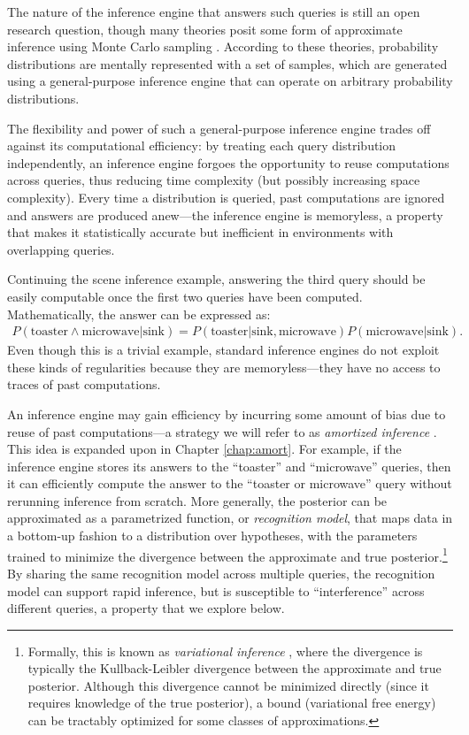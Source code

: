 The nature of the inference engine that answers such queries is still an open research question, though many theories posit some form of approximate inference using Monte Carlo sampling \citep[e.g.,][]{thaker17,dasgupta17,vul2014one,gershman12,denison13,sanborn2016bayesian,ullman2012theory}. According to these theories, probability distributions are mentally represented with a set of samples, which are generated using a general-purpose inference engine that can operate on arbitrary probability distributions.

The flexibility and power of such a general-purpose inference engine trades off against its computational efficiency: by treating each query distribution independently, an inference engine forgoes the opportunity to reuse computations across queries, thus reducing time complexity (but possibly increasing space complexity). Every time a distribution is queried, past computations are ignored and answers are produced anew---the inference engine is memoryless, a property that makes it statistically accurate but inefficient in environments with overlapping queries.

Continuing the scene inference example, answering the third query should be easily computable once the first two queries have been computed. Mathematically, the answer can be expressed as:
\begin{align}
P(\text{toaster} \wedge \text{microwave}|\text{sink}) = P(\text{toaster}|\text{sink},\text{microwave}) P(\text{microwave}|\text{sink}).
\end{align}
Even though this is a trivial example, standard inference engines do not exploit these kinds of regularities because they are memoryless---they have no access to traces of past computations.

An inference engine may gain efficiency by incurring some amount of bias due to reuse of past computations---a strategy we will refer to as \emph{amortized inference} \citep{stuhlmuller2013learning, gershman2014amortized}. This idea is expanded upon in Chapter \ref{chap:amort}. For example, if the inference engine stores its answers to the ``toaster'' and ``microwave'' queries, then it can efficiently compute the answer to the ``toaster or microwave'' query without rerunning inference from scratch. More generally, the posterior can be approximated as a parametrized function, or \emph{recognition model}, that maps data in a bottom-up fashion to a distribution over hypotheses, with the parameters trained to minimize the divergence between the approximate and true posterior.\footnote{Formally, this is known as \emph{variational inference} \citep{jordan1999introduction}, where the divergence is typically the Kullback-Leibler divergence between the approximate and true posterior. Although this divergence cannot be minimized directly (since it requires knowledge of the true posterior), a bound (variational free energy) can be tractably optimized for some classes of approximations.} By sharing the same recognition model across multiple queries, the recognition model can support rapid inference, but is susceptible to ``interference'' across different queries, a property that we explore below.

